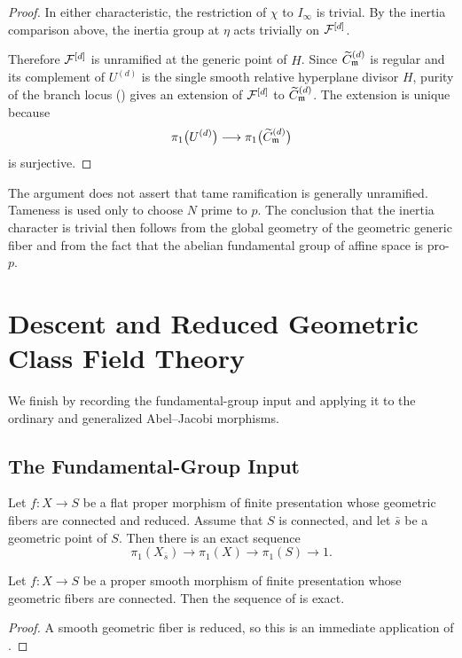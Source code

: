 \begin{proof}
In either characteristic, the restriction of $\chi$ to $I_\infty$ is
trivial. By the inertia comparison above, the inertia group at $\eta$ acts
trivially on $\mathcal{F}^{[d]}$.

Therefore $\mathcal{F}^{[d]}$ is unramified at the generic point of $H$. Since
$\widetilde C^{(d)}_{\mathfrak{m}}$ is regular and its complement of $U^{(d)}$ is
the single smooth relative hyperplane divisor $H$, purity of the branch
locus () gives an extension of $\mathcal{F}^{[d]}$ to
$\widetilde C^{(d)}_{\mathfrak{m}}$. The extension is unique because
\[
    \pi_1\bigl(U^{(d)}\bigr)
       \longrightarrow
    \pi_1\bigl(\widetilde C^{(d)}_{\mathfrak{m}}\bigr)
\]
is surjective.
\end{proof}

\begin{rem*}
The argument does not assert that tame ramification is generally
unramified. Tameness is used only to choose $N$ prime to $p$. The conclusion
that the inertia character is trivial then follows from the global geometry
of the geometric generic fiber and from the fact that the abelian
fundamental group of affine space is pro-$p$.
\end{rem*}

\section{Descent and Reduced Geometric Class Field Theory}\label{section:gcft-descent}

We finish by recording the fundamental-group input and applying it to the
ordinary and generalized Abel--Jacobi morphisms.

\subsection{The Fundamental-Group Input}

\begin{prop}[\stackstag{0C0J}]\label{prop:fundamental-group-exact-sequence}
Let $f\colon X\to S$ be a flat proper morphism of finite presentation whose
geometric fibers are connected and reduced. Assume that $S$ is connected,
and let $\bar s$ be a geometric point of $S$. Then there is an exact
sequence
\[
\pi_1(X_{\bar s})\longrightarrow\pi_1(X)\longrightarrow\pi_1(S)
\longrightarrow 1.
\]
\end{prop}

\begin{cor}\label{cor:etale_fundamental_group_smooth_proper}
Let $f\colon X\to S$ be a proper smooth morphism of finite presentation
whose geometric fibers are connected. Then the sequence of
 is exact.
\end{cor}
\begin{proof}
A smooth geometric fiber is reduced, so this is an immediate application of
.
\end{proof}

